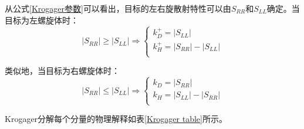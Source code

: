 从公式\ref{Krogager参数}可以看出，目标的左右旋散射特性可以由$S_{RR}$和$S_{LL}$确定。当目标为左螺旋体时：
\begin{equation}
    \left| S_{RR} \right|\geqslant \left| S_{LL} \right|\Rightarrow \left\{ \begin{array}{c}
        k_{D}^{+}=\left| S_{LL} \right|                       \\
        k_{H}^{+}=\left| S_{RR} \right|-\left| S_{LL} \right| \\
    \end{array} \right.
\end{equation}

类似地，当目标为右螺旋体时：
\begin{equation}
    \left| S_{RR} \right|\leqslant \left| S_{LL} \right|\Rightarrow \left\{ \begin{array}{c}
        k_D=\left| S_{RR} \right|                       \\
        k_H=\left| S_{LL} \right|-\left| S_{RR} \right| \\
    \end{array} \right.
\end{equation}

Krogager分解每个分量的物理解释如表\ref{Krogager table}所示。
\begin{table}[h]
    \caption{Krogager分解}
    \label{Krogager table}
\end{table}

